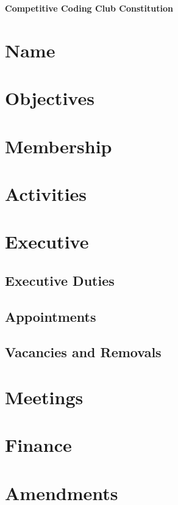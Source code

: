 \documentclass[11pt]{article}
\begin{document}
{\fontsize{20}{24}\center\bfseries Competitive Coding Club Constitution \par}

\section{Name}

\section{Objectives}

\section{Membership}

\section{Activities}

\section{Executive}

\subsection{Executive Duties}

\subsection{Appointments}

\subsection{Vacancies and Removals}

\section{Meetings}

\section{Finance}

\section{Amendments}
\end{document}
